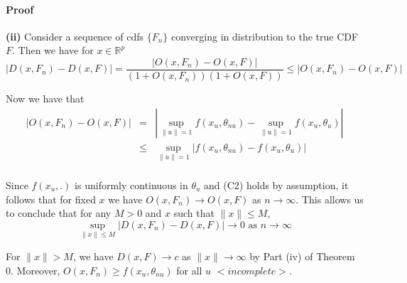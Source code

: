 \documentclass{article}
\begin{document}
\paragraph{Proof}
\textbf{(ii)} Consider a sequence of cdfs $\{F_n\}$ converging in distribution to the true CDF $F$. Then we have for $x\in\mathbb{R}^p$
$$ |D(x,F_n)-D(x,F)| = \frac{|O(x,F_n)-O(x,F)|}{(1+O(x,F_n))(1+O(x,F))} \leq |O(x,F_n)-O(x,F)| $$

Now we have that
\begin{eqnarray*}
|O(x, F_n) - O(x, F)| &=& \left| \sup_{\|u\|=1} f(x_u, \theta_{nu}) - \sup_{\|u\|=1} f(x_u, \theta_u) \right|\\
&\leq & \sup_{\|u\|=1} \left| f(x_u, \theta_{nu}) - f(x_u, \theta_u) \right|\\
\end{eqnarray*}

Since $f(x_u,.)$ is uniformly continuous in $\theta_u$ and (C2) holds by assumption, it follows that for fixed $x$ we have $O(x,F_n) \rightarrow O(x,F)$ as $n \rightarrow \infty$. This allows us to conclude that for any $M>0$ and $x$ such that $\|x\| \leq M$,
$$ \sup_{\|x\| \leq M} |D(x,F_n) - D(x,F)| \rightarrow 0 \mbox{ as } n \rightarrow \infty $$

For $\|x\| > M$, we have $D(x,F) \rightarrow c$ as $\|x\| \rightarrow \infty$ by Part (iv) of Theorem 0. Moreover, $O(x,F_n) \geq f(x_u, \theta_{nu})$ for all $u$ $<incomplete>$.
\end{document}
